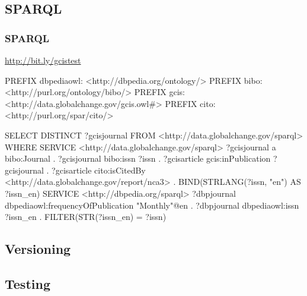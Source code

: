 \documentclass{beamer}
\begin{document}
\subsection{SPARQL}
\begin{frame}[fragile]
    \frametitle{SPARQL}
     \url{http://bit.ly/gcistest}
\begin{tiny}
\begin{semiverbatim}
PREFIX dbpediaowl: <http://dbpedia.org/ontology/>
PREFIX bibo: <http://purl.org/ontology/bibo/>
PREFIX gcis: <http://data.globalchange.gov/gcis.owl#>
PREFIX cito: <http://purl.org/spar/cito/>

SELECT DISTINCT ?gcisjournal
FROM <http://data.globalchange.gov/sparql>
WHERE {
{
   SERVICE <http://data.globalchange.gov/sparql> {
     ?gcisjournal a bibo:Journal .
     ?gcisjournal bibo:issn ?issn .
     ?gcisarticle gcis:inPublication ?gcisjournal .
     ?gcisarticle cito:isCitedBy <http://data.globalchange.gov/report/nca3> .
   } 
   BIND(STRLANG(?issn, "en") AS ?issn_en)
}  
   SERVICE <http://dbpedia.org/sparql> {
     ?dbpjournal dbpediaowl:frequencyOfPublication "Monthly"@en .
     ?dbpjournal dbpediaowl:issn ?issn_en .
     FILTER(STR(?issn_en) = ?issn)
   } 
}  
\end{semiverbatim}
\end{tiny}

\end{frame}


\subsection{Versioning}

\subsection{Testing}
\end{document}
